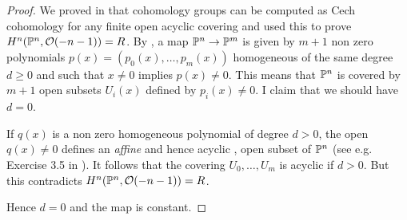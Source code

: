 \begin{proof}
We proved in \cite{cech-draft} that cohomology groups can be computed as Cech cohomology for any
finite open acyclic covering and used this to prove $H^n(\mathbb{P}^n,\mathcal{O}(-n-1))=R$.
By , a map $\mathbb{P}^n\rightarrow\mathbb{P}^m$ is given by $m+1$ non zero polynomials
$p(x) = (p_0(x),\dots,p_m(x))$ homogeneous of the same degree $d\geqslant 0$ and such that $x\neq 0$ implies $p(x)\neq 0$.
This means that $\mathbb{P}^n$ is covered by $m+1$ open subsets $U_i(x)$ defined by $p_i(x)\neq 0$.
I claim that we should have $d=0$.

 If $q(x)$ is a non zero homogeneous polynomial of degree $d>0$, the open $q(x)\neq 0$ defines an {\em affine}
 and hence acyclic \cite{cech-draft}, open subset of $\mathbb{P}^n$ (see e.g. Exercise 3.5 in \cite{Hartshorne}).
 It follows that the covering $U_0,\dots,U_m$ is acyclic if $d>0$. But this contradicts $H^n(\mathbb{P}^n,\mathcal{O}(-n-1))=R$.

 Hence $d=0$ and the map is constant.
\end{proof}
